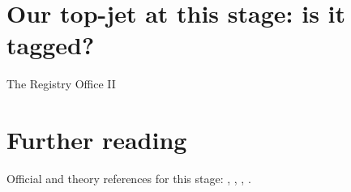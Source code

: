 \section{Our top-jet at this stage: is it tagged?}
\label{sec:registry_office_top:our_top_jet_at_this_stage_is_it_tagged}

\begin{ledger}{The Registry Office II}
\end{ledger}

\section{Further reading}
\label{sec:registry_office_top:further_reading}
Official and theory references for this stage: \cite{CMS:2020poo}, \cite{Lapsien:2016zor}, \cite{Qu:2019gqs}, \cite{Kasieczka:2019dbj}.

\begin{pitfalls}
\end{pitfalls}

\begin{exercises}
\item {}
\item {}
\end{exercises}
